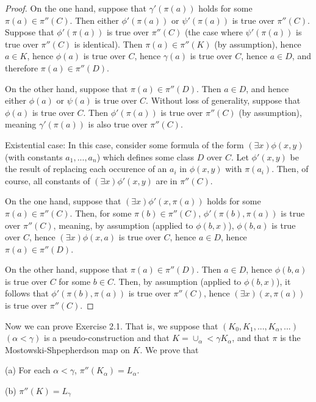 \documentclass{article}
\theoremstyle{definition}
\begin{document}
\begin{proof}
On the one hand, suppose that $\gamma'(\pi(a))$ holds for some $\pi(a)\in\pi''(C)$. Then either 
$\phi'(\pi(a))$ or $\psi'(\pi(a))$ is true over $\pi''(C)$. Suppose that $\phi'(\pi(a))$ is true over 
$\pi''(C)$ (the case where $\psi'(\pi(a))$ is true over $\pi''(C)$ is identical). Then $\pi(a)\in\pi''(K)$ (by assumption), hence 
$a\in K$, hence $\phi(a)$ is true over $C$, hence $\gamma(a)$ is true over $C$, hence $a\in D$, and therefore 
$\pi(a)\in\pi''(D)$.

On the other hand, suppose that $\pi(a)\in\pi''(D)$. Then $a\in D$, and hence either $\phi(a)$ or $\psi(a)$ is true over 
$C$. Without loss of generality, suppose that $\phi(a)$ is true over $C$. Then $\phi'(\pi(a))$ is true over $\pi''(C)$ (by assumption), 
meaning $\gamma'(\pi(a))$ is also true over $\pi''(C)$. 

Existential case: In this case, consider some formula of the form $(\exists x)\phi(x,y)$ (with constants $a_1,...,a_n$) which 
defines some class $D$ over $C$. Let $\phi'(x,y)$ be the result of replacing each occurence of an $a_i$ in $\phi(x,y)$ with 
$\pi(a_i)$. Then, of course, all constants of $(\exists x)\phi'(x,y)$ are in $\pi''(C)$. 

On the one hand, suppose that $(\exists x)\phi'(x,\pi(a))$ holds for some $\pi(a)\in\pi''(C)$. Then, for some 
$\pi(b)\in\pi''(C)$, $\phi'(\pi(b),\pi(a))$ is true over $\pi''(C)$, meaning, by assumption (applied to $\phi(b,x)$),
$\phi(b,a)$ is true over $C$, hence $(\exists x)\phi(x,a)$ is true over $C$, hence $a\in D$, hence $\pi(a)\in\pi''(D)$.

On the other hand, suppose that $\pi(a)\in\pi''(D)$. Then $a\in D$, hence 
$\phi(b,a)$ is true over $C$ for some $b\in C$. Then, by assumption (applied to $\phi(b,x)$), 
it follows that $\phi'(\pi(b),\pi(a))$ is true over $\pi''(C)$, hence $(\exists x)(x,\pi(a))$ is true over 
$\pi''(C)$.
\end{proof}

Now we can prove Exercise 2.1. That is, we suppose that $(K_0,K_1,...,K_\alpha,...)$ $(\alpha<\gamma)$ is a pseudo-construction 
and that $K=\cup_\alpha<\gamma K_\alpha$, and that $\pi$ is the Mostowski-Shpepherdson map on $K$. We prove that

(a) For each $\alpha<\gamma$, $\pi''(K_\alpha)=L_\alpha$.

(b) $\pi''(K)=L_\gamma$
\end{document}
